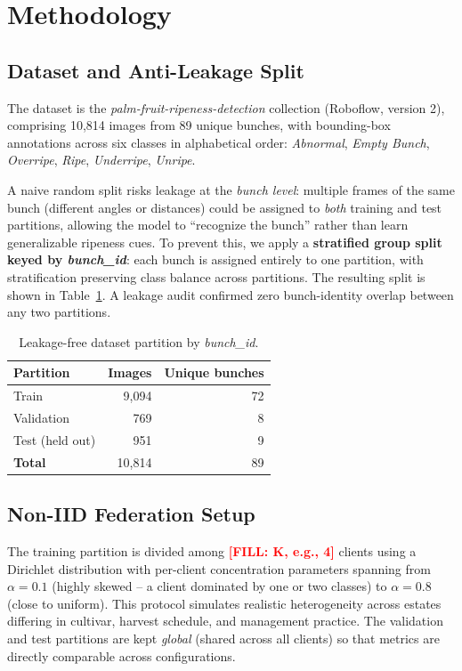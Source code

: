 \documentclass[a4paper,10pt]{article}
\newcommand{\tbd}[1]{\textcolor{red}{\textbf{[FILL: #1]}}}
\begin{document}
\section{Methodology}

\subsection{Dataset and Anti-Leakage Split}
The dataset is the \emph{palm-fruit-ripeness-detection} collection (Roboflow,
version 2), comprising 10,814 images from 89 unique bunches, with bounding-box
annotations across six classes in alphabetical order: \textit{Abnormal},
\textit{Empty Bunch}, \textit{Overripe}, \textit{Ripe}, \textit{Underripe},
\textit{Unripe}.

A naive random split risks leakage at the \emph{bunch level}: multiple frames
of the same bunch (different angles or distances) could be assigned to
\emph{both} training and test partitions, allowing the model to ``recognize
the bunch'' rather than learn generalizable ripeness cues. To prevent this, we
apply a \textbf{stratified group split keyed by \textit{bunch\_id}}: each
bunch is assigned entirely to one partition, with stratification preserving
class balance across partitions. The resulting split is shown in
Table~\ref{tab:split}. A leakage audit confirmed zero bunch-identity overlap
between any two partitions.

\begin{table}[ht]
\centering
\caption{Leakage-free dataset partition by \textit{bunch\_id}.}
\label{tab:split}
\begin{tabular}{lrr}
\toprule
\textbf{Partition} & \textbf{Images} & \textbf{Unique bunches} \\
\midrule
Train & 9{,}094 & 72 \\
Validation & 769 & 8 \\
Test (held out) & 951 & 9 \\
\midrule
\textbf{Total} & 10{,}814 & 89 \\
\bottomrule
\end{tabular}
\end{table}

\subsection{Non-IID Federation Setup}
The training partition is divided among \tbd{K, e.g., 4} clients using a
Dirichlet distribution with per-client concentration parameters spanning from
$\alpha = 0.1$ (highly skewed -- a client dominated by one or two classes) to
$\alpha = 0.8$ (close to uniform). This protocol simulates realistic
heterogeneity across estates differing in cultivar, harvest schedule, and
management practice. The validation and test partitions are kept
\emph{global} (shared across all clients) so that metrics are directly
comparable across configurations.
\end{document}

